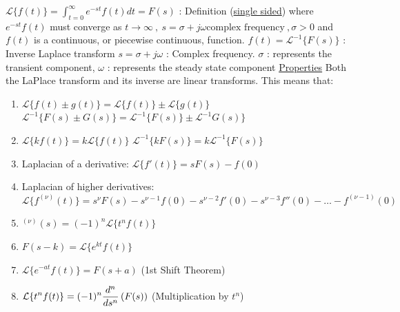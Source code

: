 \documentclass[12pt]{article}
\begin{document}
\begin{flushleft}
	\textbullet \quad $\displaystyle \mathcal{L} \{ f(t) \} = \int_{t=0}^{\infty} e^{-st} f(t) dt = F(s) $  :  Definition (\uline{single sided}) \linebreak 
	where $\displaystyle e^{-st}f(t)$ must converge as $\displaystyle t\to \infty \ , \ s=\sigma +j\omega \text{complex frequency} \ , \sigma >0$ \linebreak 	
	and $f(t)$ is a continuous, or piecewise continuous, function. \linebreak 
	\textbullet \quad $\displaystyle f(t) = \mathcal{L}^{-1} \{ F(s) \} $  :  Inverse Laplace transform \linebreak 
	\textbullet \quad $s= \sigma + j\omega$  :  Complex frequency. $\sigma$  :  represents the  transient component, $\omega$  :  represents the steady state component \linebreak 
	\uline{Properties} \linebreak 
	\textbullet \quad Both the LaPlace transform and its inverse are linear transforms. This means that:  
	\begin{enumerate}
	\item $\displaystyle \mathcal{L} \{f(t) \pm g(t) \} = \mathcal{L} \{ f(t) \} \pm \mathcal{L} \{ g(t) \} $ \linebreak 
			$\displaystyle \mathcal{L}^{-1} \{ F(s) \pm G(s) \} = \mathcal{L}^{-1} \{ F(s) \} \pm \mathcal{L}^{-1} G(s) \}$
	\item $\displaystyle \mathcal{L} \{ kf(t) \} = k \mathcal{L} \{ f(t) \} $ \linebreak 
			$\displaystyle \mathcal{L}^{-1} \{kF(s) \} = k\mathcal{L}^{-1} \{ F(s) \} $ 
	\item Laplacian of a derivative: $\displaystyle \mathcal{L} \{ f'(t) \} = sF(s) - f(0) $
	\item Laplacian of higher derivatives: \linebreak 
			$\displaystyle \mathcal{L} \{ f^{(\nu)} (t) \} = s^{\nu} F(s) - s^{\nu -1} f(0) - s^{\nu -2} f'(0) - s^{\nu -3} f''(0) - \ldots - f^{(\nu -1)} (0)$ 
	\item $\displaystyle ^{(\nu)} (s) = (-1)^n \mathcal{L} \{ t^n f(t) \} $ 
	\item $\displaystyle F(s-k) = \mathcal{L} \{ e^{kt} f(t) \} $ 
	\item $\displaystyle \mathcal{L} \{ e^{-at} f(t) \} = F(s+a) $ (1st Shift Theorem) 
	\item $\displaystyle \displaystyle \mathcal{L} \{ t^n f(t) \} = (-1)^n \frac{d^n}{ds^n} \left(F(s)\right) $ (Multiplication by $t^n$) 

\end{enumerate}
\end{flushleft}
\end{document}
